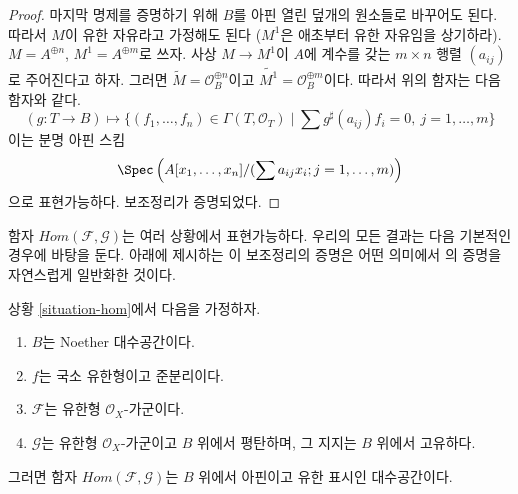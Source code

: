 \begin{proof}
\medskip\noindent
마지막 명제를 증명하기 위해 $B$를 아핀 열린 덮개의 원소들로
바꾸어도 된다. 따라서 $M$이 유한 자유라고 가정해도 된다
($M^1$은 애초부터 유한 자유임을 상기하라).
$M = A^{\oplus n}$, $M^1 = A^{\oplus m}$로 쓰자.
사상 $M \to M^1$이 $A$에 계수를 갖는 $m \times n$ 행렬
$(a_{ij})$로 주어진다고 하자. 그러면
$\widetilde{M} = \mathcal{O}_B^{\oplus n}$이고
$\widetilde{M^1} = \mathcal{O}_B^{\oplus m}$이다.
따라서 위의 함자는 다음 함자와 같다.
$$
(g : T \to B) \longmapsto
\{(f_1, \ldots, f_n) \in \Gamma(T, \mathcal{O}_T) \mid
\sum g^\sharp(a_{ij})f_i = 0,\ j = 1, \ldots, m\}
$$
이는 분명 아핀 스킴
$$
\Spec\left(A[x_1, \ldots, x_n]/(\sum a_{ij}x_i; j = 1, \ldots, m)\right)
$$
으로 표현가능하다. 보조정리가 증명되었다.
\end{proof}

\noindent
함자 $\mathit{Hom}(\mathcal{F}, \mathcal{G})$는 여러 상황에서
표현가능하다. 우리의 모든 결과는 다음 기본적인 경우에 바탕을 둔다.
아래에 제시하는 이 보조정리의 증명은 어떤 의미에서
\cite[III, Cor 7.7.8]{EGA}의 증명을 자연스럽게 일반화한 것이다.

\begin{lemma}
\label{lemma-noetherian-hom}
상황 \ref{situation-hom}에서 다음을 가정하자.
\begin{enumerate}
\item $B$는 Noether 대수공간이다.
\item $f$는 국소 유한형이고 준분리이다.
\item $\mathcal{F}$는 유한형 $\mathcal{O}_X$-가군이다.
\item $\mathcal{G}$는 유한형 $\mathcal{O}_X$-가군이고 $B$ 위에서
평탄하며, 그 지지는 $B$ 위에서 고유하다.
\end{enumerate}
그러면 함자 $\mathit{Hom}(\mathcal{F}, \mathcal{G})$는
$B$ 위에서 아핀이고 유한 표시인 대수공간이다.
\end{lemma}

